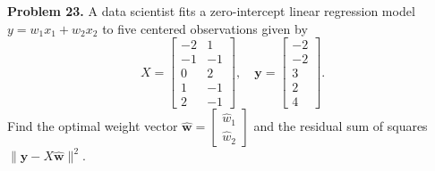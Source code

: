 \documentclass[11pt, letterpaper]{article}
\theoremstyle{definition}
\theoremstyle{remark}
\begin{document}
\textbf{Problem 23.} A data scientist fits a zero-intercept linear regression model $y = w_1 x_1 + w_2 x_2$ to five centered observations given by
\[
X = \begin{bmatrix} -2 & 1 \\ -1 & -1 \\ 0 & 2 \\ 1 & -1 \\ 2 & -1 \end{bmatrix}, \quad \mathbf{y} = \begin{bmatrix} -2 \\ -2 \\ 3 \\ 2 \\ 4 \end{bmatrix}.
\]
Find the optimal weight vector $\hat{\mathbf{w}} = \begin{bmatrix} \hat{w}_1 \\ \hat{w}_2 \end{bmatrix}$ and the residual sum of squares $\|\mathbf{y} - X\hat{\mathbf{w}}\|^2$.
\end{document}
